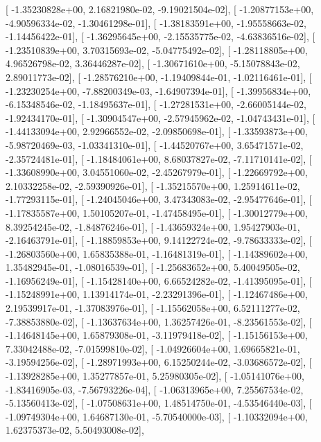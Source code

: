 \documentclass{article}
\begin{document}
       [ -1.35230828e+00,   2.16821980e-02,  -9.19021504e-02],
       [ -1.20877153e+00,  -4.90596334e-02,  -1.30461298e-01],
       [ -1.38183591e+00,  -1.95558663e-02,  -1.14456422e-01],
       [ -1.36295645e+00,  -2.15535775e-02,  -4.63836516e-02],
       [ -1.23510839e+00,   3.70315693e-02,  -5.04775492e-02],
       [ -1.28118805e+00,   4.96526798e-02,   3.36446287e-02],
       [ -1.30671610e+00,  -5.15078843e-02,   2.89011773e-02],
       [ -1.28576210e+00,  -1.19409844e-01,  -1.02116461e-01],
       [ -1.23230254e+00,  -7.88200349e-03,  -1.64907394e-01],
       [ -1.39956834e+00,  -6.15348546e-02,  -1.18495637e-01],
       [ -1.27281531e+00,  -2.66005144e-02,  -1.92434170e-01],
       [ -1.30904547e+00,  -2.57945962e-02,  -1.04743431e-01],
       [ -1.44133094e+00,   2.92966552e-02,  -2.09850698e-01],
       [ -1.33593873e+00,  -5.98720469e-03,  -1.03341310e-01],
       [ -1.44520767e+00,   3.65471571e-02,  -2.35724481e-01],
       [ -1.18484061e+00,   8.68037827e-02,  -7.11710141e-02],
       [ -1.33608990e+00,   3.04551060e-02,  -2.45267979e-01],
       [ -1.22669792e+00,   2.10332258e-02,  -2.59390926e-01],
       [ -1.35215570e+00,   1.25914611e-02,  -1.77293115e-01],
       [ -1.24045046e+00,   3.47343083e-02,  -2.95477646e-01],
       [ -1.17835587e+00,   1.50105207e-01,  -1.47458495e-01],
       [ -1.30012779e+00,   8.39254245e-02,  -1.84876246e-01],
       [ -1.43659324e+00,   1.95427903e-01,  -2.16463791e-01],
       [ -1.18859853e+00,   9.14122724e-02,  -9.78633333e-02],
       [ -1.26803560e+00,   1.65835388e-01,  -1.16481319e-01],
       [ -1.14389602e+00,   1.35482945e-01,  -1.08016539e-01],
       [ -1.25683652e+00,   5.40049505e-02,  -1.16956249e-01],
       [ -1.15428140e+00,   6.66524282e-02,  -1.41395095e-01],
       [ -1.15248991e+00,   1.13914174e-01,  -2.23291396e-01],
       [ -1.12467486e+00,   2.19539917e-01,  -1.37083976e-01],
       [ -1.15562058e+00,   6.52111277e-02,  -7.38853880e-02],
       [ -1.13637634e+00,   1.36257426e-01,  -8.23561553e-02],
       [ -1.14648145e+00,   1.65879308e-01,  -3.11979418e-02],
       [ -1.15156153e+00,   7.33042488e-02,  -7.01599810e-02],
       [ -1.04926604e+00,   1.69665821e-01,  -3.19594256e-02],
       [ -1.28971993e+00,   6.15250244e-02,  -3.03686572e-02],
       [ -1.13928285e+00,   1.35277857e-01,   5.25980305e-02],
       [ -1.05141076e+00,  -1.83416905e-03,  -7.56793226e-04],
       [ -1.06313965e+00,   7.25567534e-02,  -5.13560413e-02],
       [ -1.07508631e+00,   1.48514750e-01,  -4.53546440e-03],
       [ -1.09749304e+00,   1.64687130e-01,  -5.70540000e-03],
       [ -1.10332094e+00,   1.62375373e-02,   5.50493008e-02],
\end{document}

